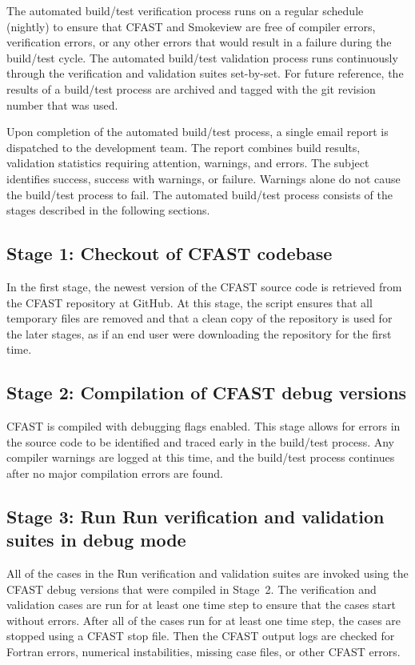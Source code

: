 \documentclass[12pt]{book}
\begin{document}
The automated build/test verification process runs on a regular schedule (nightly) to ensure that CFAST and Smokeview are free of compiler errors, verification errors, or any other errors that would result in a failure during the build/test cycle. The automated build/test validation process runs continuously through the verification and validation suites set-by-set. For future reference, the results of a build/test process are archived and tagged with the git revision number that was used.

Upon completion of the automated build/test process, a single email report is dispatched to the development team. The report combines build results, validation statistics requiring attention, warnings, and errors. The subject identifies success, success with warnings, or failure. Warnings alone do not cause the build/test process to fail. The automated build/test process consists of the stages described in the following sections.

\subsection*{Stage 1: Checkout of CFAST codebase}

In the first stage, the newest version of the CFAST source code is retrieved from the CFAST repository at GitHub. At this stage, the script ensures that all temporary files are removed and that a clean copy of the repository is used for the later stages, as if an end user were downloading the repository for the first time.

\subsection*{Stage 2: Compilation of CFAST debug versions}

CFAST is compiled with debugging flags enabled. This stage allows for errors in the source code to be identified and traced early in the build/test process. Any compiler warnings are logged at this time, and the build/test process continues after no major compilation errors are found.

\subsection*{Stage 3: Run Run verification and validation suites in debug mode}

All of the cases in the Run verification and validation suites are invoked using the CFAST debug versions that were compiled in Stage~2. The verification and validation cases are run for at least one time step to ensure that the cases start without errors. After all of the cases run for at least one time step, the cases are stopped using a CFAST stop file. Then the CFAST output logs are checked for Fortran errors, numerical instabilities, missing case files, or other CFAST errors.
\end{document}
